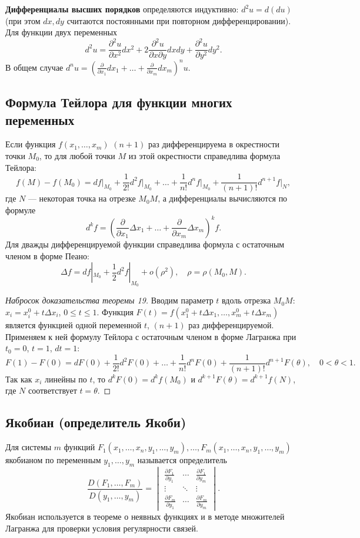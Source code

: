 \documentclass{article}
\theoremstyle{definition}
\begin{document}
\textbf{Дифференциалы высших порядков} определяются индуктивно: $d^2u=d(du)$ (при этом $dx,dy$ считаются постоянными при повторном дифференцировании). Для функции двух переменных
\[
d^2u = \frac{\partial^2 u}{\partial x^2}dx^2 + 2\frac{\partial^2 u}{\partial x\partial y}dxdy + \frac{\partial^2 u}{\partial y^2}dy^2.
\]
В общем случае $d^n u = \left(\frac{\partial}{\partial x_1}dx_1+\dots+\frac{\partial}{\partial x_m}dx_m\right)^n u$.

\subsection{Формула Тейлора для функции многих переменных}
Если функция $f(x_1,\dots,x_m)$ $(n+1)$ раз дифференцируема в окрестности точки $M_0$, то для любой точки $M$ из этой окрестности справедлива формула Тейлора:
\[
f(M)-f(M_0)=df\big|_{M_0}+\frac{1}{2!}d^2f\big|_{M_0}+\dots+\frac{1}{n!}d^nf\big|_{M_0}+\frac{1}{(n+1)!}d^{n+1}f\big|_{N},
\]
где $N$ — некоторая точка на отрезке $M_0M$, а дифференциалы вычисляются по формуле
\[
d^k f = \left(\frac{\partial}{\partial x_1}\Delta x_1+\dots+\frac{\partial}{\partial x_m}\Delta x_m\right)^k f.
\]
Для дважды дифференцируемой функции справедлива формула с остаточным членом в форме Пеано:
\[
\Delta f = df|_{M_0} + \frac{1}{2}d^2f|_{M_0} + o(\rho^2),\quad \rho=\rho(M_0,M).
\]

\begin{proof}[Набросок доказательства теоремы 19]
Вводим параметр $t$ вдоль отрезка $M_0M$: $x_i=x_i^0+t\Delta x_i$, $0\le t\le1$. Функция $F(t)=f(x_1^0+t\Delta x_1,\dots,x_m^0+t\Delta x_m)$ является функцией одной переменной $t$, $(n+1)$ раз дифференцируемой. Применяем к ней формулу Тейлора с остаточным членом в форме Лагранжа при $t_0=0$, $t=1$, $dt=1$:
\[
F(1)-F(0)=dF(0)+\frac{1}{2!}d^2F(0)+\dots+\frac{1}{n!}d^nF(0)+\frac{1}{(n+1)!}d^{n+1}F(\theta),\quad 0<\theta<1.
\]
Так как $x_i$ линейны по $t$, то $d^kF(0)=d^kf(M_0)$ и $d^{k+1}F(\theta)=d^{k+1}f(N)$, где $N$ соответствует $t=\theta$.
\end{proof}

\subsection{Якобиан (определитель Якоби)}
Для системы $m$ функций $F_1(x_1,\dots,x_n,y_1,\dots,y_m),\dots,F_m(x_1,\dots,x_n,y_1,\dots,y_m)$ якобианом по переменным $y_1,\dots,y_m$ называется определитель
\[
\frac{D(F_1,\dots,F_m)}{D(y_1,\dots,y_m)} = \begin{vmatrix}
\frac{\partial F_1}{\partial y_1} & \cdots & \frac{\partial F_1}{\partial y_m} \\
\vdots & \ddots & \vdots \\
\frac{\partial F_m}{\partial y_1} & \cdots & \frac{\partial F_m}{\partial y_m}
\end{vmatrix}.
\]
Якобиан используется в теореме о неявных функциях и в методе множителей Лагранжа для проверки условия регулярности связей.
\end{document}
